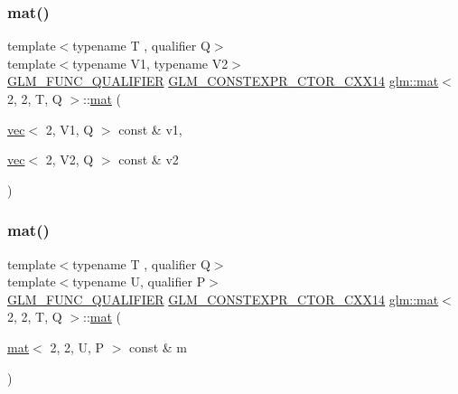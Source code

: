 \subsubsection{\texorpdfstring{mat()}{mat()}\hspace{0.1cm}{\footnotesize\ttfamily [20/21]}}
{\footnotesize\ttfamily template$<$typename T , qualifier Q$>$ \\
template$<$typename V1, typename V2$>$ \\
\mbox{\hyperlink{setup_8hpp_a33fdea6f91c5f834105f7415e2a64407}{G\+L\+M\+\_\+\+F\+U\+N\+C\+\_\+\+Q\+U\+A\+L\+I\+F\+I\+ER}} \mbox{\hyperlink{setup_8hpp_a0900f9145e68bf6061b6f5e7be3fa751}{G\+L\+M\+\_\+\+C\+O\+N\+S\+T\+E\+X\+P\+R\+\_\+\+C\+T\+O\+R\+\_\+\+C\+X\+X14}} \mbox{\hyperlink{structglm_1_1mat}{glm\+::mat}}$<$ 2, 2, T, Q $>$\+::\mbox{\hyperlink{structglm_1_1mat}{mat}} (\begin{DoxyParamCaption}\item[{\mbox{\hyperlink{structglm_1_1vec}{vec}}$<$ 2, V1, Q $>$ const \&}]{v1,  }\item[{\mbox{\hyperlink{structglm_1_1vec}{vec}}$<$ 2, V2, Q $>$ const \&}]{v2 }\end{DoxyParamCaption})}

\mbox{\label{structglm_1_1mat_3_012_00_012_00_01_t_00_01_q_01_4_a93387113fa262d6612cc51c980056241}} 
\subsubsection{\texorpdfstring{mat()}{mat()}\hspace{0.1cm}{\footnotesize\ttfamily [21/21]}}
{\footnotesize\ttfamily template$<$typename T , qualifier Q$>$ \\
template$<$typename U, qualifier P$>$ \\
\mbox{\hyperlink{setup_8hpp_a33fdea6f91c5f834105f7415e2a64407}{G\+L\+M\+\_\+\+F\+U\+N\+C\+\_\+\+Q\+U\+A\+L\+I\+F\+I\+ER}} \mbox{\hyperlink{setup_8hpp_a0900f9145e68bf6061b6f5e7be3fa751}{G\+L\+M\+\_\+\+C\+O\+N\+S\+T\+E\+X\+P\+R\+\_\+\+C\+T\+O\+R\+\_\+\+C\+X\+X14}} \mbox{\hyperlink{structglm_1_1mat}{glm\+::mat}}$<$ 2, 2, T, Q $>$\+::\mbox{\hyperlink{structglm_1_1mat}{mat}} (\begin{DoxyParamCaption}\item[{\mbox{\hyperlink{structglm_1_1mat}{mat}}$<$ 2, 2, U, P $>$ const \&}]{m }\end{DoxyParamCaption})}



